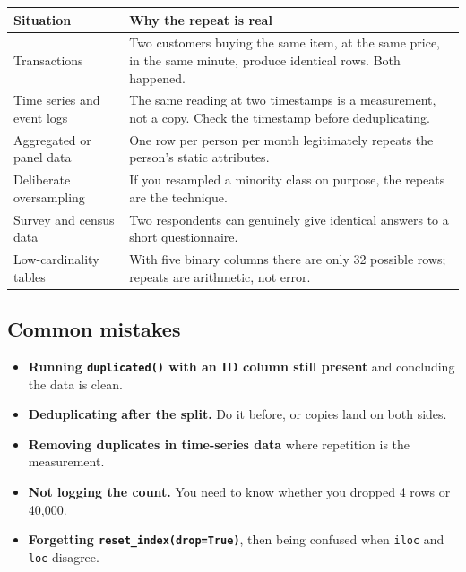 \documentclass[11pt,a4paper]{article}
\begin{document}
\begin{tabularx}{\textwidth}{@{}l X@{}}
\toprule
\rowcolor{tablehead} \textbf{Situation} & \textbf{Why the repeat is real} \\
\midrule
Transactions & Two customers buying the same item, at the same price, in the same minute, produce identical rows. Both happened. \\
Time series and event logs & The same reading at two timestamps is a measurement, not a copy. Check the timestamp before deduplicating. \\
Aggregated or panel data & One row per person per month legitimately repeats the person's static attributes. \\
Deliberate oversampling & If you resampled a minority class on purpose, the repeats are the technique. \\
Survey and census data & Two respondents can genuinely give identical answers to a short questionnaire. \\
Low-cardinality tables & With five binary columns there are only 32 possible rows; repeats are arithmetic, not error. \\
\bottomrule
\end{tabularx}



\subsection*{Common mistakes}

\begin{itemize}\itemsep3pt
  \item \textbf{Running \lstinline|duplicated()| with an ID column still present} and
        concluding the data is clean.
  \item \textbf{Deduplicating after the split.} Do it before, or copies land on both sides.
  \item \textbf{Removing duplicates in time-series data} where repetition is the
        measurement.
  \item \textbf{Not logging the count.} You need to know whether you dropped 4 rows or
        40,000.
  \item \textbf{Forgetting \lstinline|reset_index(drop=True)|}, then being confused when
        \lstinline|iloc| and \lstinline|loc| disagree.
\end{itemize}
\end{document}
